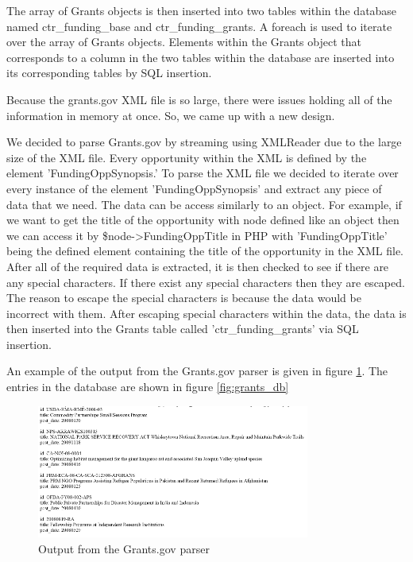 \documentclass[onecolumn]{IEEEtran}
\begin{document}
The array of Grants objects is then inserted into two tables within the database named ctr\_funding\_base and ctr\_funding\_grants. A foreach is used to iterate over the array of Grants objects. Elements within the Grants object that corresponds to a column in the two tables within the database are inserted into its corresponding tables by SQL insertion. 

Because the grants.gov XML file is so large, there were issues holding all of the information in memory at once. So, we came up with a new design.

We decided to parse Grants.gov by streaming using XMLReader due to the large size of the XML file. Every opportunity within the XML is defined by the element 'FundingOppSynopsis.' To parse the XML file we decided to iterate over every instance of the element 'FundingOppSynopsis' and extract any piece of data that we need. The data can be access similarly to an object. For example, if we want to get the title of the opportunity with node defined like an object then we can access it by \$node->FundingOppTitle in PHP with 'FundingOppTitle' being the defined element containing the title of the opportunity in the XML file. After all of the required data is extracted, it is then checked to see if there are any special characters. If there exist any special characters then they are escaped. The reason to escape the special characters is because the data would be incorrect with them. After escaping special characters within the data, the data is then inserted into the Grants table called 'ctr\_funding\_grants' via SQL insertion.  

An example of the output from the Grants.gov parser is given in figure \ref{fig:grants_output}. The entries in the database are shown in figure \ref{fig:grants_db}

\begin{figure}
    \centering
    \includegraphics[width=0.8\textwidth]{senior_design_grants_output.png}
    \caption{Output from the Grants.gov parser}
    \label{fig:grants_output}
\end{figure}
\end{document}
